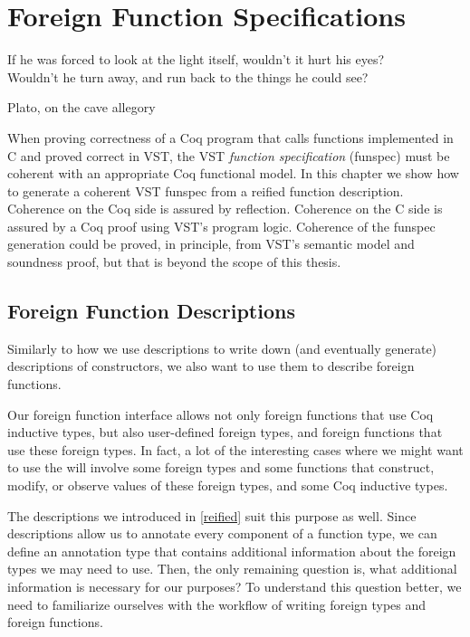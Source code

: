 \chapter{Foreign Function Specifications}
\label{primspecs}

\epigraph{If he was forced to look at the light itself, wouldn’t it hurt his eyes? \\Wouldn’t he turn away, and run back to the things he could see?}{Plato, on the cave allegory~\cite{Plato2000}}

When proving correctness of a Coq program that calls functions implemented in C and proved correct in VST, the VST \emph{function specification} (funspec) must be coherent with an appropriate Coq \gls{functional model}.
In this chapter we show how to generate a coherent VST funspec from a reified function description.  Coherence on the Coq side is assured by reflection.  Coherence on the C side is assured by a Coq proof using VST's program logic.  Coherence of the funspec generation could be proved, in principle, from VST's semantic model and soundness proof, but that is beyond the scope of this thesis.

\section{Foreign Function Descriptions}
\label{primdesc}

Similarly to how we use \reified{} descriptions to write down (and eventually generate) descriptions of constructors, we also want to use them to describe \gls{foreign function}s.

Our foreign function interface allows not only \gls{foreign function}s that use Coq \gls{inductive type}s, but also user-defined \gls{foreign type}s, and \gls{foreign function}s that use these \gls{foreign type}s. In fact, a lot of the interesting cases where we might want to use the 
\ffi{} will involve some \gls{foreign type}s and some functions that construct, modify, or observe values of these \gls{foreign type}s, and some Coq \gls{inductive type}s. 


The \reified{} descriptions we introduced in \autoref{reified} suit this purpose as well. Since \reified{} descriptions allow us to annotate every component of a function type, we can define an annotation type that contains additional information about the \gls{foreign type}s we may need to use. Then, the only remaining question is, what additional information is necessary for our purposes? To understand this question better, we need to familiarize ourselves with the workflow of writing \gls{foreign type}s and \gls{foreign function}s.


